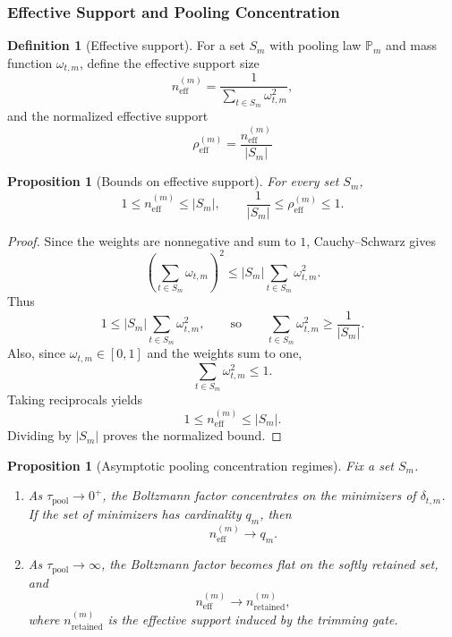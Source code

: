 \documentclass{article}
\theoremstyle{plain}
\newtheorem{proposition}[theorem]{Proposition}
\theoremstyle{definition}
\newtheorem{definition}[theorem]{Definition}
\theoremstyle{remark}
\begin{document}
\subsubsection{Effective Support and Pooling Concentration}
\label{sec:tier-b-effective-support}

\begin{definition}[Effective support]
\label{def:effective-support}
For a set $S_m$ with pooling law $\mathbb{P}_m$ and mass function $\omega_{t,m}$, define the effective support size
\begin{equation}
\label{eq:effective-support}
n_{\mathrm{eff}}^{(m)}
=
\frac{1}{\sum_{t\in S_m} \omega_{t,m}^2},
\end{equation}
and the normalized effective support
\begin{equation}
\label{eq:normalized-effective-support}
\rho_{\mathrm{eff}}^{(m)}
=
\frac{n_{\mathrm{eff}}^{(m)}}{|S_m|}
\end{equation}
\end{definition}

\begin{proposition}[Bounds on effective support]
\label{prop:effective-support-bounds}
For every set $S_m$,
\begin{equation}
\label{eq:effective-support-bounds}
1 \le n_{\mathrm{eff}}^{(m)} \le |S_m|,
\qquad
\frac{1}{|S_m|}\le \rho_{\mathrm{eff}}^{(m)}\le 1.
\end{equation}
\end{proposition}

\begin{proof}
Since the weights are nonnegative and sum to $1$, Cauchy--Schwarz gives
\[
\left(\sum_{t\in S_m}\omega_{t,m}\right)^2
\le
|S_m| \sum_{t\in S_m}\omega_{t,m}^2.
\]
Thus
\[
1 \le |S_m| \sum_{t\in S_m}\omega_{t,m}^2,
\qquad\text{so}\qquad
\sum_{t\in S_m}\omega_{t,m}^2 \ge \frac{1}{|S_m|}.
\]
Also, since $\omega_{t,m}\in [0,1]$ and the weights sum to one,
\[
\sum_{t\in S_m}\omega_{t,m}^2 \le 1.
\]
Taking reciprocals yields
\[
1 \le n_{\mathrm{eff}}^{(m)} \le |S_m|.
\]
Dividing by $|S_m|$ proves the normalized bound.
\end{proof}

\begin{proposition}[Asymptotic pooling concentration regimes]
\label{prop:pooling-concentration-regimes}
Fix a set $S_m$.

\begin{enumerate}
    \item As $\tau_{\mathrm{pool}}\to 0^+$, the Boltzmann factor concentrates on the minimizers of $\delta_{t,m}$. If the set of minimizers has cardinality $q_m$, then
    \[
    n_{\mathrm{eff}}^{(m)} \to q_m.
    \]

    \item As $\tau_{\mathrm{pool}}\to \infty$, the Boltzmann factor becomes flat on the softly retained set, and
    \[
    n_{\mathrm{eff}}^{(m)} \to n_{\mathrm{retained}}^{(m)},
    \]
    where $n_{\mathrm{retained}}^{(m)}$ is the effective support induced by the trimming gate.
\end{enumerate}
\end{proposition}
\end{document}
